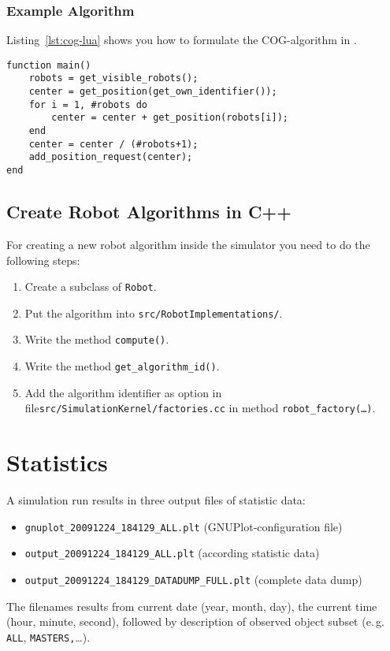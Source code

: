 \documentclass[a4paper,halfparskip,11pt,twoside]{scrartcl}
\begin{document}
\subsubsection{Example Algorithm}
Listing~\ref{lst:cog-lua} shows you how to formulate the COG-algorithm in \Lua.

\lstset{language=lua}
\begin{lstlisting}[caption={COG algorithm in \Lua},label=lst:cog-lua]
function main() 
    robots = get_visible_robots();
    center = get_position(get_own_identifier());
    for i = 1, #robots do
        center = center + get_position(robots[i]);
    end
    center = center / (#robots+1);
    add_position_request(center);
end
\end{lstlisting}

\subsection{Create Robot Algorithms in C++}
For creating a new robot algorithm inside the simulator you need to do the following steps:
\begin{enumerate}
	\item Create a subclass of \texttt{Robot}.
	\item Put the algorithm into \texttt{src/RobotImplementations/}.
	\item Write the method \texttt{compute()}.
	\item Write the method \texttt{get\_algorithm\_id()}.
	\item Add the algorithm identifier as option in file\newline \texttt{src/SimulationKernel/factories.cc} in method \texttt{robot\_factory(\dots)}.
\end{enumerate}



\section{Statistics}
A simulation run results in three output files of statistic data:

\begin{itemize}
\item \texttt{gnuplot\_20091224\_184129\_ALL.plt} (GNUPlot-configuration file)
\item \texttt{output\_20091224\_184129\_ALL.plt} (according statistic data)
\item \texttt{output\_20091224\_184129\_DATADUMP\_FULL.plt} (complete data dump)
\end{itemize}

The filenames results from current date (year, month, day), the current time (hour, minute, second), followed by description of observed object subset (e.\,g. \texttt{ALL}, \linebreak \texttt{MASTERS,}\dots).

\newpage
\appendix


\newpage 


\newpage


\newpage
\thispagestyle{empty}
~
\end{document}
